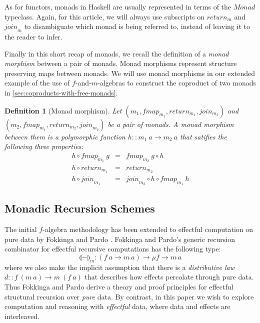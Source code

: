 \documentclass{jfp1}
\newcommand{\fold}[1]{\llparenthesis #1 \rrparenthesis}
\newtheorem{definition}{Definition}
\begin{document}
As for functors, monads in Haskell are usually represented in terms of
the $\textit{Monad}$ typeclass. Again, for this article, we will
always use subscripts on $\mathit{return}_m$ and $\mathit{join}_m$ to
disambiguate which monad is being referred to, instead of leaving it
to the reader to infer.

Finally in this short recap of monads, we recall the definition of a
\emph{monad morphism} between a pair of monads. Monad morphisms
represent structure preserving maps between monads. We will use monad
morphisms in our extended example of the use of $f$-and-$m$-algebras
to construct the coproduct of two monads in
\autoref{sec:coproducts-with-free-monads}.

\begin{definition}[Monad morphism]
  Let $(m_1, \mathit{fmap_{m_1}}, \mathit{return}_{m_1},
  \mathit{join_{m_1}})$ and $(m_2, \mathit{fmap_{m_1}},
  \mathit{return}_{m_2}, \mathit{join}_{m_2})$ be a pair of monads. A
  \emph{monad morphism} between them is a polymorphic function $h ::
  m_1~a \to m_2~a$ that satifies the following three properties:
  \begin{eqnarray}
    \label{eq:monad-mor-natural}
    h \circ \mathit{fmap}_{m_1}~g & = & \mathit{fmap}_{m_2}~g \circ h \\
    \label{eq:monad-mor-return}
    h \circ \mathit{return}_{m_1} & = & \mathit{return}_{m_2} \\
    \label{eq:monad-mor-join}
    h \circ \mathit{join}_{m_1} & = & \mathit{join}_{m_2} \circ h \circ \mathit{fmap}_{m_1}~h
  \end{eqnarray}
\end{definition}

\subsection{Monadic Recursion Schemes}

The initial $f$-algebra methodology has been extended to effectful
computation on pure data by Fokkinga \cite{fokkinga94monadic} and
Pardo \cite{pardo04combining}. Fokkinga and Pardo's generic recursion
combinator for effectful recursive computations has the following
type:
\begin{displaymath}
  \fold{-}_m : (f~a \to m~a) \to \mu f \to m~a
\end{displaymath}
where we also make the implicit assumption that there is a
\emph{distributive law} $d :: f~(m~a) \to m~(f~a)$ that describes how
effects percolate through pure data. Thus Fokkinga and Pardo derive a
theory and proof principles for effectful structural recursion over
\emph{pure} data. By contrast, in this paper we wish to explore
computation and reasoning with \emph{effectful} data, where data and
effects are interleaved.
\end{document}
